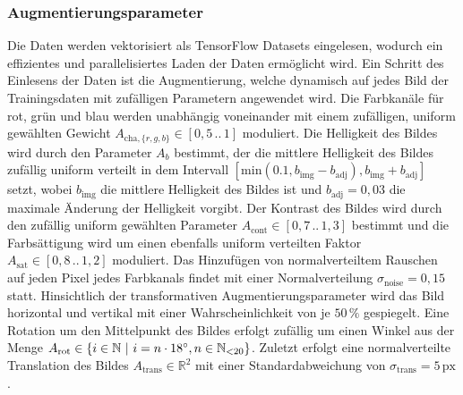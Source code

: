 \subsubsection{Augmentierungsparameter}

Die Daten werden vektorisiert als TensorFlow Datasets eingelesen, wodurch ein effizientes und parallelisiertes Laden der Daten ermöglicht wird. Ein Schritt des Einlesens der Daten ist die Augmentierung, welche dynamisch auf jedes Bild der Trainingsdaten mit zufälligen Parametern angewendet wird. Die Farbkanäle für rot, grün und blau werden unabhängig voneinander mit einem zufälligen, uniform gewählten Gewicht $A_{\text{cha}, \{r,g,b\}} \in [0,5\,..\,1]$ moduliert. Die Helligkeit des Bildes wird durch den Parameter $A_b$ bestimmt, der die mittlere Helligkeit des Bildes zufällig uniform verteilt in dem Intervall $[\text{min}(0.1, b_\text{img}-b_\text{adj}), b_\text{img} + b_\text{adj}]$ setzt, wobei $b_\text{img}$ die mittlere Helligkeit des Bildes ist und $b_\text{adj} = 0,03$ die maximale Änderung der Helligkeit vorgibt. Der Kontrast des Bildes wird durch den zufällig uniform gewählten Parameter $A_\text{cont} \in [0,7\,..\,1,3]$ bestimmt und die Farbsättigung wird um einen ebenfalls uniform verteilten Faktor $A_\text{sat} \in [0,8\,..\, 1,2]$ moduliert. Das Hinzufügen von normalverteiltem Rauschen auf jeden Pixel jedes Farbkanals findet mit einer Normalverteilung $\sigma_\text{noise} = 0,15$ statt. Hinsichtlich der transformativen Augmentierungsparameter wird das Bild horizontal und vertikal mit einer Wahrscheinlichkeit von je $50\,\%$ gespiegelt. Eine Rotation um den Mittelpunkt des Bildes erfolgt zufällig um einen Winkel aus der Menge $A_\text{rot} \in \{i \in \mathbb{N} ~\vert~ i = n \cdot 18^{\circ}, n \in \mathbb{N}_{<20}\}$. Zuletzt erfolgt eine normalverteilte Translation des Bildes $A_\text{trans} \in \mathbb{R}^2$ mit einer Standardabweichung von $\sigma_\text{trans} = 5\,\text{px}$.
